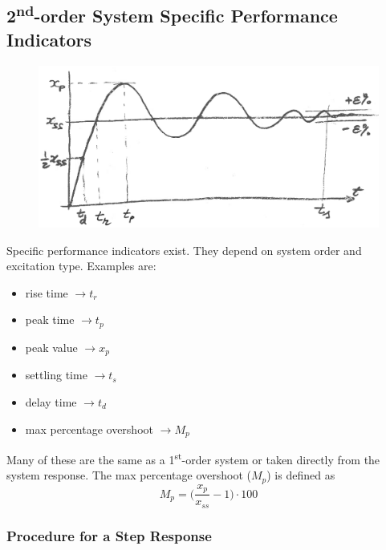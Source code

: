 \documentclass[12pt,letter]{article}
\numberwithin{ex}{section} %
\numberwithin{re}{section} %
\numberwithin{equation}{section}	%
\begin{document}
\subsection{2\textsuperscript{nd}-order System Specific Performance Indicators}

\begin{figure}[H]
	\centering
	\includegraphics[width=5.5in]{../figures/2nd_order_system_specific_performance_indicators}
\end{figure}

Specific performance indicators exist. They depend on system order and excitation type. Examples are: 
\begin{itemize}
	\item rise time $ \rightarrow t_r$
	\item peak time  $ \rightarrow t_p$
	\item peak value  $ \rightarrow x_p$
	\item settling time $ \rightarrow t_s$
	\item delay time  $ \rightarrow t_d$
	\item max percentage overshoot $ \rightarrow M_p$
\end{itemize}
Many of these are the same as a 1\textsuperscript{st}-order system or taken directly from the system response. The max percentage overshoot ($M_p$) is defined as 
\begin{equation}
M_p = \bigg( \frac{x_p}{x_{ss}}-1 \bigg) \cdot 100
\end{equation}

\subsubsection{Procedure for a Step Response}
\end{document}
